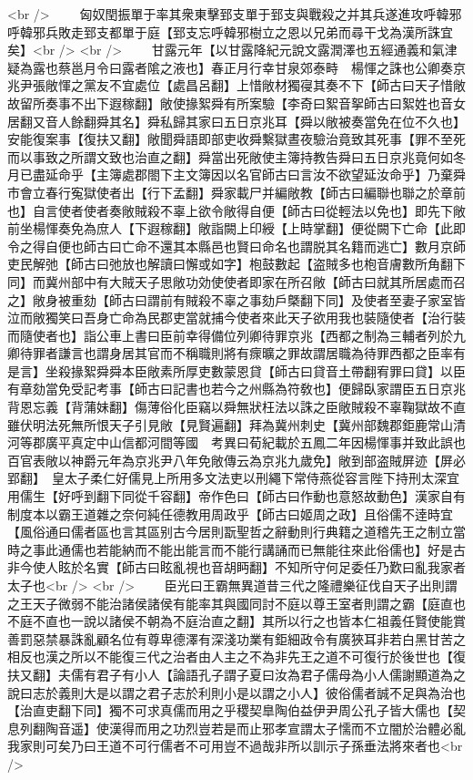 <br />
　　匈奴閏振單于率其衆東擊郅支單于郅支與戰殺之并其兵遂進攻呼韓邪呼韓邪兵敗走郅支都單于庭【郅支忘呼韓邪樹立之恩以兄弟而尋干戈為漢所誅宜矣】<br />
<br />
　　甘露元年【以甘露降紀元說文露潤澤也五經通義和氣津疑為露也蔡邕月令曰露者隂之液也】春正月行幸甘泉郊泰畤　楊惲之誅也公卿奏京兆尹張敞惲之黨友不宜處位【處昌呂翻】上惜敞材獨寑其奏不下【師古曰天子惜敞故留所奏事不出下遐稼翻】敞使掾絮舜有所案驗【李奇曰絮音挐師古曰絮姓也音女居翻又音人餘翻舜其名】舜私歸其家曰五日京兆耳【舜以敞被奏當免在位不久也】安能復案事【復扶又翻】敞聞舜語即部吏收舜繫獄晝夜驗治竟致其死事【罪不至死而以事致之所謂文致也治直之翻】舜當出死敞使主簿持教告舜曰五日京兆竟何如冬月已盡延命乎【主簿處郡閤下主文簿因以名官師古曰言汝不欲望延汝命乎】乃棄舜市會立春行寃獄使者出【行下孟翻】舜家載尸并編敞教【師古曰編聯也聯之於章前也】自言使者使者奏敞賊殺不辜上欲令敞得自便【師古曰從輕法以免也】即先下敞前坐楊惲奏免為庶人【下遐稼翻】敞詣闕上印綬【上時掌翻】便從闕下亡命【此即令之得自便也師古曰亡命不還其本縣邑也賢曰命名也謂脱其名籍而逃亡】數月京師吏民解弛【師古曰弛放也解讀曰懈或如字】枹鼓數起【盗賊多也枹音膚數所角翻下同】而冀州部中有大賊天子思敞功効使使者即家在所召敞【師古曰就其所居處而召之】敞身被重劾【師古曰謂前有賊殺不辜之事劾戶槩翻下同】及使者至妻子家室皆泣而敞獨笑曰吾身亡命為民郡吏當就捕今使者來此天子欲用我也裝隨使者【治行裝而隨使者也】詣公車上書曰臣前幸得備位列卿待罪京兆【西都之制為三輔者列於九卿待罪者謙言也謂身居其官而不稱職則將有瘝曠之罪故謂居職為待罪西都之臣率有是言】坐殺掾絮舜舜本臣敞素所厚吏數蒙恩貸【師古曰貸音土帶翻宥罪曰貸】以臣有章劾當免受記考事【師古曰記書也若今之州縣為符敎也】便歸臥家謂臣五日京兆背恩忘義【背蒲妹翻】傷薄俗化臣竊以舜無狀枉法以誅之臣敞賊殺不辜鞠獄故不直雖伏明法死無所恨天子引見敞【見賢遍翻】拜為冀州刺史【冀州部魏郡鉅鹿常山清河等郡廣平真定中山信都河間等國　考異曰荀紀載於五鳳二年因楊惲事并致此誤也百官表敞以神爵元年為京兆尹八年免敞傳云為京兆九歲免】敞到部盗賊屏迹【屏必郢翻】　皇太子柔仁好儒見上所用多文法吏以刑繩下常侍燕從容言陛下持刑太深宜用儒生【好呼到翻下同從千容翻】帝作色曰【師古曰作動也意怒故動色】漢家自有制度本以霸王道雜之奈何純任德教用周政乎【師古曰姬周之政】且俗儒不逹時宜【風俗通曰儒者區也言其區别古今居則翫聖哲之辭動則行典籍之道稽先王之制立當時之事此通儒也若能納而不能出能言而不能行講誦而已無能往來此俗儒也】好是古非今使人眩於名實【師古曰眩亂視也音胡眄翻】不知所守何足委任乃歎曰亂我家者太子也<br />
<br />
　　臣光曰王霸無異道昔三代之隆禮樂征伐自天子出則謂之王天子微弱不能治諸侯諸侯有能率其與國同討不庭以尊王室者則謂之霸【庭直也不庭不直也一說以諸侯不朝為不庭治直之翻】其所以行之也皆本仁祖義任賢使能賞善罰惡禁暴誅亂顧名位有尊卑德澤有深淺功業有鉅細政令有廣狹耳非若白黑甘苦之相反也漢之所以不能復三代之治者由人主之不為非先王之道不可復行於後世也【復扶又翻】夫儒有君子有小人【論語孔子謂子夏曰汝為君子儒母為小人儒謝顯道為之說曰志於義則大是以謂之君子志於利則小是以謂之小人】彼俗儒者誠不足與為治也【治直吏翻下同】獨不可求真儒而用之乎稷契臯陶伯益伊尹周公孔子皆大儒也【契息列翻陶音遥】使漢得而用之功烈豈若是而止邪孝宣謂太子懦而不立闇於治體必亂我家則可矣乃曰王道不可行儒者不可用豈不過哉非所以訓示子孫垂法將來者也<br />
